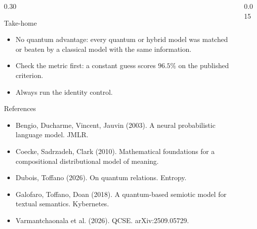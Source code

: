 \documentclass[final]{beamer}
\begin{document}
\begin{frame}[t]
\begin{columns}[T, totalwidth=\textwidth]
\begin{column}{0.30\textwidth}
\begin{alertblock}{Take-home}
\begin{itemize}
\item No quantum advantage: every quantum or hybrid model was matched or beaten by a classical model with the same information.
\item Check the metric first: a constant guess scores $96.5\%$ on the published criterion.
\item Always run the identity control.
\end{itemize}
\end{alertblock}

\begin{block}{References}
\small
\begin{itemize}
\item Bengio, Ducharme, Vincent, Jauvin (2003). A neural probabilistic language model. JMLR.
\item Coecke, Sadrzadeh, Clark (2010). Mathematical foundations for a compositional distributional model of meaning.
\item Dubois, Toffano (2026). On quantum relations. Entropy.
\item Galofaro, Toffano, Doan (2018). A quantum-based semiotic model for textual semantics. Kybernetes.
\item Varmantchaonala et al. (2026). QCSE. arXiv:2509.05729.
\end{itemize}
\end{block}
\end{column}

\begin{column}{0.015\textwidth}\end{column}
\end{columns}
\end{frame}
\end{document}
